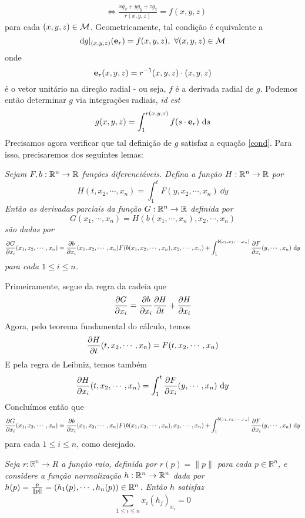 \begin{dem}
\begin{equation}
\begin{aligned}
 &\iff \frac{x g_{x} + y g_{y} + z g_z}{r(x, y, z)} = f(x, y, z)
\end{aligned}
\end{equation}
para cada $(x, y, z) \in \mathcal{M}$. Geometricamente, tal condição é equivalente a
\[
\mathrm{d} g\vert_{(x, y, z)} (\mathbf{e}_r) = f(x, y, z), \ \forall (x, y, z) \in \mathcal{M}
\]
onde
\[
\mathbf{e}_r(x, y, z) = r^{-1}(x, y, z)\cdot (x, y, z)
\]
é o vetor unitário na direção radial - ou seja, $f$ é a derivada radial de $g$. Podemos então determinar $g$ via integrações radiais, \emph{id est}
\[
g(x, y, z) = \int_{1}^{r(x, y, z)} f(s \cdot \mathbf{e}_r) \ \mathrm{d} s
\]
Precisamos agora verificar que tal definição de $g$ satisfaz a equação \cref{cond}. Para isso, precisaremos dos seguintes lemas:
\begin{lema}\label{deriv}
\textit{
Sejam $F, b: \mathbb{R}^n \to \mathbb{R}$ funções diferenciáveis. Defina a função $H: \mathbb{R}^n \to \mathbb{R}$ por
\[
H(t, x_2, \cdots, x_n) = \int_{1}^{t} F(y, x_2, \cdots, x_n) \ \dd y
\]
Então as derivadas parciais da função $G: \mathbb{R}^n \to \mathbb{R}$ definida por 
\[
G(x_1, \cdots, x_n) = H(b(x_1, \cdots, x_n), x_2, \cdots, x_n)
\] são dadas por
\[
\frac{\partial G}{\partial x_i} (x_1, x_2, \cdots, x_n) = \frac{\partial b}{\partial x_i} (x_1, x_2, \cdots, x_n) F(b(x_1, x_2, \cdots, x_n), x_2, \cdots, x_n) + \int_{1}^{b(x_1, x_2, \cdots, x_n)} \frac{\partial F}{\partial x_i}(y, \cdots, x_n) \ \mathrm{d} y
\]
para cada $1 \leq i \leq n$.
}
\end{lema}
\begin{demm}
Primeiramente, segue da regra da cadeia que
\[
\frac{\partial G}{\partial x_i} = \frac{\partial b}{\partial x_i} \frac{\partial H}{\partial t} + \frac{\partial H}{\partial x_i}
\]
Agora, pelo teorema fundamental do cálculo, temos
\[
\frac{\partial H}{\partial t}(t, x_2, \cdots, x_n) = F(t, x_2, \cdots, x_n)
\]
E pela regra de Leibniz, temos também
\[
\frac{\partial H}{\partial x_i}(t, x_2, \cdots, x_n) = \int_{1}^{t} \frac{\partial F}{\partial x_i}(y, \cdots, x_n) \ \mathrm{d} y
\]
Concluímos então que
\[
\frac{\partial G}{\partial x_i} (x_1, x_2, \cdots, x_n) = \frac{\partial b}{\partial x_i} (x_1, x_2, \cdots, x_n) F(b(x_1, x_2, \cdots, x_n), x_2, \cdots, x_n) + \int_{1}^{b(x_1, x_2, \cdots, x_n)} \frac{\partial F}{\partial x_i}(y, \cdots, x_n) \ \mathrm{d} y
\]
para cada $1 \leq i \leq n$, como desejado.
\end{demm}
\begin{lema}\label{soma0}
\textit{
Seja $r: \mathbb{R}^n \to R$ a função raio, definida por $r(p) = \| p \|$ para cada $p \in \mathbb{R}^n$, e considere a função normalização $h: \mathbb{R}^n \to \mathbb{R}^n$ dada por $h(p) = \frac{p}{\| p \|} = (h_1(p), \cdots, h_n(p)) \in \mathbb{R}^n$. Então $h$ satisfaz
\[
\sum_{1 \leq i \leq n} x_i \left(h_j \right)_{x_i} = 0
\]}
\end{lema}
\end{dem}
